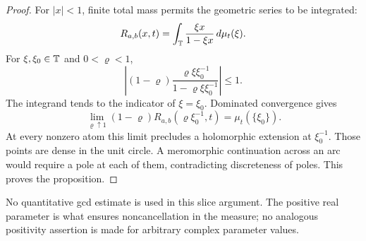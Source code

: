 \begin{proof}
For \(|x|<1\), finite total mass permits the geometric series to be
integrated:
\[
R_{a,b}(x,t)
=\int_{\mathbb T}\frac{\xi x}{1-\xi x}\,d\mu_t(\xi).
\]
For \(\xi,\xi_0\in\mathbb T\) and \(0<\varrho<1\),
\[
\left|(1-\varrho)
\frac{\varrho\xi\xi_0^{-1}}{1-\varrho\xi\xi_0^{-1}}\right|\leq1.
\]
The integrand tends to the indicator of \(\xi=\xi_0\).
Dominated convergence gives
\begin{equation}\label{eq:slice-radial}
\lim_{\varrho\uparrow1}(1-\varrho)
R_{a,b}(\varrho\xi_0^{-1},t)=\mu_t(\{\xi_0\}).
\end{equation}
At every nonzero atom this limit precludes a holomorphic extension
at \(\xi_0^{-1}\). Those points are dense in the unit circle.
A meromorphic continuation across an arc would require a pole at
each of them, contradicting discreteness of poles. This proves the
proposition.
\end{proof}

No quantitative gcd estimate is used in this slice argument.
The positive real parameter is what ensures noncancellation in the
measure; no analogous positivity assertion is made for arbitrary
complex parameter values.
